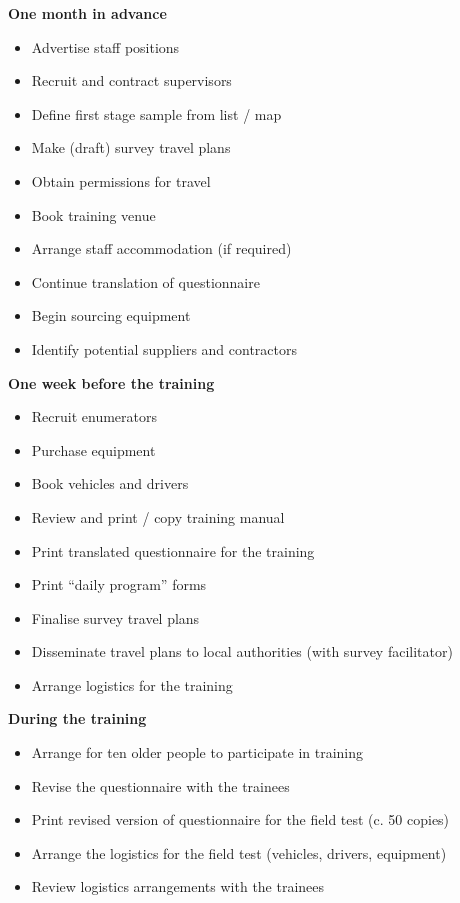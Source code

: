 \documentclass[12pt,a4paper]{book}
\providecommand{\tightlist}{%
  \setlength{\itemsep}{0pt}\setlength{\parskip}{0pt}}
\begin{document}
\textbf{One month in advance}

\begin{itemize}
\tightlist
\item
  Advertise staff positions
\item
  Recruit and contract supervisors
\item
  Define first stage sample from list / map
\item
  Make (draft) survey travel plans
\item
  Obtain permissions for travel
\item
  Book training venue
\item
  Arrange staff accommodation (if required)
\item
  Continue translation of questionnaire
\item
  Begin sourcing equipment
\item
  Identify potential suppliers and contractors
\end{itemize}

\textbf{One week before the training}

\begin{itemize}
\tightlist
\item
  Recruit enumerators
\item
  Purchase equipment
\item
  Book vehicles and drivers
\item
  Review and print / copy training manual
\item
  Print translated questionnaire for the training
\item
  Print ``daily program'' forms
\item
  Finalise survey travel plans
\item
  Disseminate travel plans to local authorities (with survey facilitator)
\item
  Arrange logistics for the training
\end{itemize}

\textbf{During the training}

\begin{itemize}
\tightlist
\item
  Arrange for ten older people to participate in training
\item
  Revise the questionnaire with the trainees
\item
  Print revised version of questionnaire for the field test (c. 50 copies)
\item
  Arrange the logistics for the field test (vehicles, drivers, equipment)
\item
  Review logistics arrangements with the trainees
\end{itemize}
\end{document}
